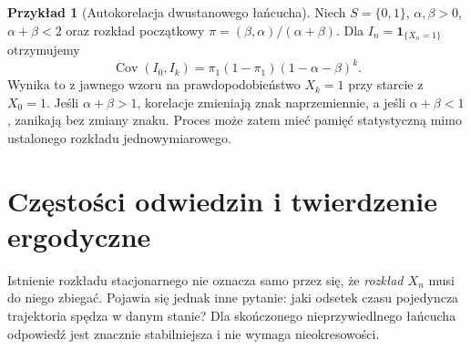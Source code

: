 \documentclass[11pt,a4paper,oneside]{report}
\numberwithin{equation}{chapter}
\theoremstyle{plain}
\theoremstyle{definition}
\newtheorem{przyklad}{Przykład}[chapter]
\theoremstyle{remark}
\newcommand{\Cov}{\operatorname{Cov}}
\newcommand{\ind}[1]{\mathbf{1}_{#1}}
\begin{document}
\begin{przyklad}[Autokorelacja dwustanowego łańcucha]
Niech $S=\{0,1\}$, $\alpha,\beta>0$,
$\alpha+\beta<2$ oraz rozkład początkowy
$\pi=(\beta,\alpha)/(\alpha+\beta)$.
Dla $I_n=\ind{\{X_n=1\}}$ otrzymujemy
\[
\Cov(I_0,I_k)=\pi_1(1-\pi_1)(1-\alpha-\beta)^k.
\]
Wynika to z jawnego wzoru na prawdopodobieństwo
$X_k=1$ przy starcie z $X_0=1$.
Jeśli $\alpha+\beta>1$, korelacje zmieniają
znak naprzemiennie, a jeśli $\alpha+\beta<1$,
zanikają bez zmiany znaku. Proces może zatem
mieć pamięć statystyczną mimo ustalonego rozkładu
jednowymiarowego.
\end{przyklad}

\section{Częstości odwiedzin i twierdzenie ergodyczne}

Istnienie rozkładu stacjonarnego nie oznacza samo
przez się, że \emph{rozkład $X_n$} musi do niego
zbiegać. Pojawia się jednak inne pytanie:
jaki odsetek czasu pojedyncza trajektoria
spędza w danym stanie? Dla skończonego
nieprzywiedlnego łańcucha odpowiedź jest
znacznie stabilniejsza i nie wymaga nieokresowości.
\end{document}
